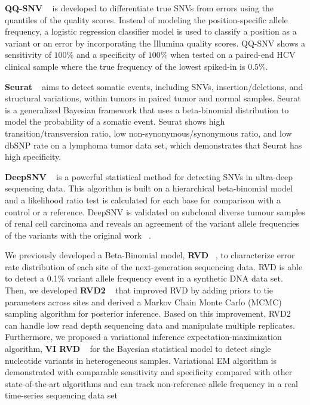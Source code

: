 \documentclass[11pt,reqno]{amsart}
\begin{document}
\textbf{QQ-SNV} ~\citep{VanderBorght2015} is developed to differentiate true SNVs from errors using the quantiles of the quality scores.
Instead of modeling the position-specific allele frequency, a logistic regression classifier model is used to classify a position as a variant or an error by incorporating the Illumina quality scores.
QQ-SNV shows a sensitivity of $100\%$ and a specificity of $100\%$ when tested on a paired-end HCV clinical sample where the true frequency of the lowest spiked-in is $0.5\%$.

\textbf{Seurat} ~\citep{Christoforides2013} aims to detect somatic events, including SNVs, insertion/deletions, and structural variations, within tumors in paired tumor and normal samples.
Seurat is a generalized Bayesian framework that uses a beta-binomial distribution to model the probability of a somatic event.
Seurat shows high transition/transversion ratio, low non-synonymous/synonymous ratio, and low dbSNP rate on a lymphoma tumor data set, which demonstrates that Seurat has high specificity.

\textbf{DeepSNV} ~\citep{gerstung2012reliable} is a powerful statistical method for detecting SNVs in ultra-deep sequencing data.
This algorithm is built on a hierarchical beta-binomial model and a likelihood ratio test is calculated for each base for comparison with a control or a reference.
DeepSNV is validated on subclonal diverse tumour samples of renal cell carcinoma and reveals an agreement of the variant allele frequencies of the variants with the original work ~\citep{gerstung2012reliable}.

We previously developed a Beta-Binomial model, \textbf{RVD} ~\citep{Flaherty2012}, to characterize error rate distribution of each site of the next-generation sequencing data.
RVD is able to detect a 0.1\% variant allele frequency event in a synthetic DNA data set.
Then, we developed \textbf{RVD2} ~\citep{He2015} that improved RVD by adding priors to tie parameters across sites and derived a Markov Chain Monte Carlo (MCMC) sampling algorithm for posterior inference.
Based on this improvement, RVD2 can handle low read depth sequencing data and manipulate multiple replicates.
Furthermore, we proposed a variational inference expectation-maximization algorithm, \textbf{VI RVD} ~\citep{zhang2016variational} for the Bayesian statistical model to detect single nucleotide variants in heterogeneous samples.
Variational EM algorithm is demonstrated with comparable sensitivity and specificity compared with other state-of-the-art algorithms and can track non-reference allele frequency in a real time-series sequencing data set
\end{document}
